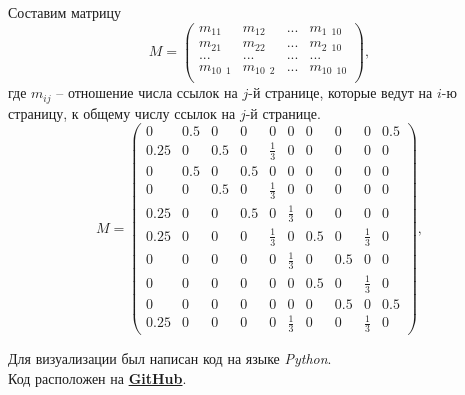 \documentclass[a5paper, 10pt]{article}
\theoremstyle{definition}
\theoremstyle{plain}
\theoremstyle{remark}
\begin{document}
Составим матрицу 
\begin{equation}
M=
\begin{pmatrix}
m_{11} & m_{12} & ... & m_{1\,\,\,10}\\
m_{21} & m_{22} & ... & m_{2\,\,\,10}\\
... & ... & ... & ...\\
m_{10\,\,\,1} & m_{10 \,\,\,2} & ... & m_{10\,\,\,10}\\
\end{pmatrix},
\end{equation}
где $m_{ij}$ -- отношение числа ссылок на $j$-й странице, которые ведут на $i$-ю страницу, к общему числу ссылок на $j$-й странице.
\begin{equation}
M=
\begin{pmatrix}
0 & 0.5 & 0 & 0 & 0 & 0 & 0 & 0 & 0 & 0.5\\
0.25 & 0 & 0.5 & 0 & \frac{1}{3} & 0 & 0 & 0 & 0 & 0\\
0 & 0.5 & 0 & 0.5 & 0 & 0 & 0 & 0 & 0 & 0\\
0 & 0 & 0.5 & 0 & \frac{1}{3} & 0 & 0 & 0 & 0 & 0\\
0.25 & 0 & 0 & 0.5 & 0 & \frac{1}{3} & 0 & 0 & 0 & 0\\
0.25 & 0 & 0 & 0 & \frac{1}{3} & 0 & 0.5 & 0 & \frac{1}{3} & 0\\
0 & 0 & 0 & 0 & 0 &\frac{1}{3} & 0 & 0.5 & 0 & 0\\
0 & 0 & 0 & 0 & 0 & 0 & 0.5 & 0 & \frac{1}{3} & 0\\
0 & 0 & 0 & 0 & 0 & 0 & 0 & 0.5 & 0 & 0.5\\
0.25 & 0 & 0 & 0 & 0 &  \frac{1}{3} & 0 & 0 & \frac{1}{3} & 0
\end{pmatrix},
\end{equation}




\newpage
Для визуализации был написан код на языке \textit{Python}. \\
Код расположен на \href{https://github.com/a-nechaeva/practical_Linal/tree/main/lab4}{\textbf{GitHub}}.
\end{document}
